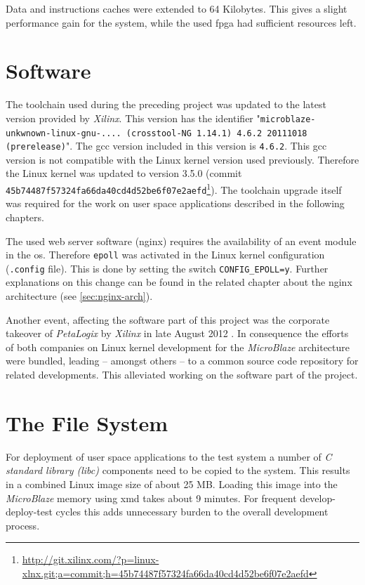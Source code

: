 Data and instructions caches were extended to 64 Kilobytes. This gives a slight performance gain for the system, while the used \gls{fpga} had sufficient resources left.
\\

\section{Software}

The toolchain used during the preceding project was updated to the latest version provided by \textit{Xilinx}. This version has the identifier "\texttt{microblaze-unkwnown-linux-gnu-.... (crosstool-NG 1.14.1) 4.6.2 20111018 (prerelease)}". The \gls{gcc} version included in this version is \texttt{4.6.2}. This \gls{gcc} version is not compatible with the Linux kernel version used previously. Therefore the Linux kernel was updated to version 3.5.0 (commit \texttt{45b74487f57324fa66da40cd4d52be6f07e2aefd}\footnote{\url{http://git.xilinx.com/?p=linux-xlnx.git;a=commit;h=45b74487f57324fa66da40cd4d52be6f07e2aefd}}). The toolchain upgrade itself was required for the work on user space applications described in the following chapters.

The used web server software (nginx) requires the availability of an event module in the \gls{os}. Therefore \texttt{epoll} was activated in the Linux kernel configuration (\texttt{.config} file). This is done by setting the switch \texttt{CONFIG\_EPOLL=y}. Further explanations on this change can be found in the related chapter about the nginx architecture (see \ref{sec:nginx-arch}).

Another event, affecting the software part of this project was the corporate takeover of \textit{PetaLogix} by \textit{Xilinx} in late August 2012 \cite{takeover}. In consequence the efforts of both companies on Linux kernel development for the \textit{MicroBlaze} architecture were bundled, leading -- amongst others -- to a common source code repository for related developments. This alleviated working on the software part of the project.
\\

\section{The File System}

For deployment of user space applications to the test system a number of \textit{C standard library (libc)} components need to be copied to the system. This results in a combined Linux image size of about 25 MB. Loading this image into the \textit{MicroBlaze} memory using \gls{xmd} takes about 9 minutes. For frequent develop-deploy-test cycles this adds unnecessary burden to the overall development process.

